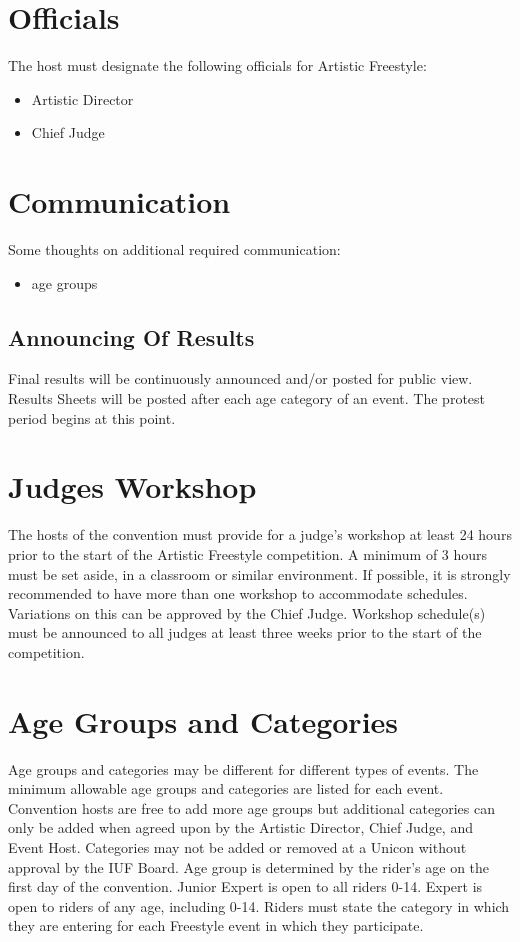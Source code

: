 \section{Officials}

The host must designate the following officials for Artistic Freestyle:
\begin{itemize}
\item Artistic Director
\item Chief Judge
\end{itemize}

\section{Communication}

\begin{comment-2016}
Some thoughts on additional required communication:
\begin{itemize}
\item age groups
\end{itemize}
\end{comment-2016}

\subsection{Announcing Of Results}

Final results will be continuously announced and/or posted for public view.
Results Sheets will be posted after each age category of an event.
The protest period begins at this point.

\section{Judges Workshop}

The hosts of the convention must provide for a judge's workshop at least 24 hours prior to the start of the Artistic Freestyle competition.
A minimum of 3 hours must be set aside, in a classroom or similar environment. %
If possible, it is strongly recommended to have more than one workshop to accommodate schedules. %
Variations on this can be approved by the Chief Judge.
Workshop schedule(s) must be announced to all judges at least three weeks prior to the start of the competition.

\section{Age Groups and Categories}
Age groups and categories may be different for different types of events.
The minimum allowable age groups and categories are listed for each event.
Convention hosts are free to add more age groups but additional categories can only be added when agreed upon by the Artistic Director, Chief Judge, and Event Host.
Categories may not be added or removed at a Unicon without approval by the IUF Board.
Age group is determined by the rider's age on the first day of the convention.
Junior Expert is open to all riders 0-14.
Expert is open to riders of any age, including 0-14.
Riders must state the category in which they are entering for each Freestyle event in which they participate.

